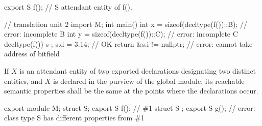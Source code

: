 \begin{std.txt}
\begin{before}
\begin{example}
\begin{codeblock}
      export S f();       // S attendant entity of f().

      // translation unit 2
      import M;
      int main() {
        int x = sizeof(decltype(f())::B);   // error: incomplete B
        int y = sizeof(decltype(f())::C);   // error: incomplete C
        decltype(f()) s { };
        s.d = 3.14;                         // OK
        return &s.i != nullptr;             // error: cannot take address of bitfield
      }
    \end{codeblock}
  \end{example}
\end{before}\begin{before}\color{addclr}
  \alinea
  If $X$ is an attendant entity of two exported declarations
  designating two distinct entities,
  and $X$ is declared in the purview of the global module,
  its reachable semantic properties shall
  be the same at the points where the declarations occur.
  \begin{example}
    \begin{codeblock}
      export module M;
      struct S;
      export S f();     // \#1
      struct S { };
      export S g();     // error: class type S has different properties from \#1
    \end{codeblock}
  \end{example}
  
\end{before}
\end{std.txt}
